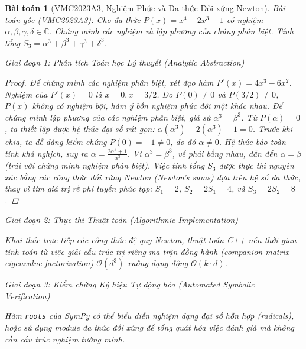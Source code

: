 \documentclass{article}
\newtheorem{baitoan}{Bài toán}
\begin{document}
\begin{baitoan}[VMC2023A3, Nghiệm Phức và Đa thức Đối xứng Newton]
 \emph{Bài toán gốc (VMC2023A3):} 
 Cho đa thức $P(x) = x^4 - 2x^3 - 1$ có nghiệm $\alpha,\beta,\gamma,\delta\in\mathbb{C}$. Chứng minh các nghiệm và lập phương của chúng phân biệt. Tính tổng $S_3 = \alpha^3 + \beta^3 + \gamma^3 +\delta^3$.

\vspace{0.5em}\noindent\emph{Giai đoạn 1: Phân tích Toán học Lý thuyết (Analytic Abstraction)}
 
 \begin{proof}
 Để chứng minh các nghiệm phân biệt, xét đạo hàm $P'(x) = 4x^3 - 6x^2$. Nghiệm của $P'(x) = 0$ là $x = 0, x = 3/2$. Do $P(0) \neq 0$ và $P(3/2) \neq 0$, $P(x)$ không có nghiệm bội, hàm ý bốn nghiệm phức đôi một khác nhau.
 Để chứng minh lập phương của các nghiệm phân biệt, giả sử $\alpha^3 = \beta^3$. Từ $P(\alpha) = 0$, ta thiết lập được hệ thức đại số rút gọn: $\alpha(\alpha^3) - 2(\alpha^3) - 1 = 0$. Trước khi chia, ta dễ dàng kiểm chứng $P(0) = -1 \ne 0$, do đó $\alpha \ne 0$. Hệ thức bảo toàn tính khả nghịch, suy ra $\alpha = \frac{2\alpha^3 + 1}{\alpha^3}$. Vì $\alpha^3 = \beta^3$, vế phải bằng nhau, dẫn đến $\alpha = \beta$ (trái với chứng minh nghiệm phân biệt).
 Việc tính tổng $S_3$ được thực thi nguyên xác bằng các công thức đối xứng Newton (Newton's sums) dựa trên hệ số đa thức, thay vì tìm giá trị rễ phi tuyến phức tạp: 
 $S_1 = 2$, $S_2 = 2S_1 = 4$, và $S_3 = 2S_2 = 8$.

 \end{proof}
\vspace{0.5em}\noindent\emph{Giai đoạn 2: Thực thi Thuật toán (Algorithmic Implementation)}
 
 Khai thác trực tiếp các công thức đệ quy Newton, thuật toán C++ nén thời gian tính toán từ việc giải cấu trúc trị riêng ma trận đồng hành (companion matrix eigenvalue factorization) $\mathcal{O}(d^3)$ xuống dạng động $\mathcal{O}(k \cdot d)$.



\vspace{0.5em}\noindent\emph{Giai đoạn 3: Kiểm chứng Ký hiệu Tự động hóa (Automated Symbolic Verification)}
 
 Hàm \texttt{roots} của \textsf{SymPy} có thể biểu diễn nghiệm dạng đại số hỗn hợp (radicals), hoặc sử dụng module đa thức đối xứng để tổng quát hóa việc đánh giá mà không cần cấu trúc nghiệm tường minh.


\end{baitoan}
\end{document}
